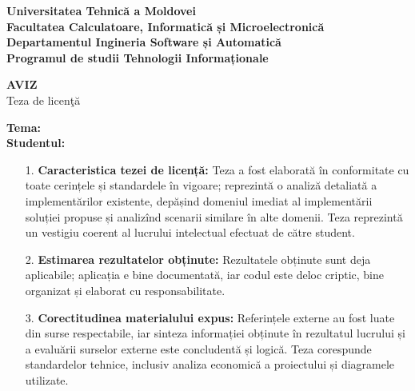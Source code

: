 \begin{titlepage}

    \newcommand{\HRule}{\rule{\linewidth}{0.5mm}}
    
    \begin{center}
        \textbf{
            Universitatea Tehnică a Moldovei\\
            Facultatea Calculatoare, Informatică și Microelectronică\\
            Departamentul Ingineria Software și Automatică\\
            Programul de studii Tehnologii Informaționale\\
        }
    \end{center}
    \center
    
    \vspace{0.3cm}
    \begin{center}
        \large \textbf{AVIZ} \\
        Teza de licenţă \\
    \vspace{0.2cm}
    
    \end{center}
    
    \begin{flushleft}
        \textbf{Tema:} \ThesisTitle \\
        \textbf{Studentul:} \MyNameFull
        
        \begin{enumerate}[leftmargin=1.4em, itemsep=1pt, parsep=0pt]
        \item [1.] \textbf{Caracteristica tezei de licență:}  Teza a fost elaborată în conformitate cu toate cerințele și standardele în vigoare; reprezintă o analiză detaliată a implementărilor existente, depășind domeniul imediat al implementării soluției propuse și analizînd scenarii similare în alte domenii. Teza reprezintă un vestigiu coerent al lucrului intelectual efectuat de către student.
        
        \item [2.] \textbf{Estimarea rezultatelor obținute:} Rezultatele obținute sunt deja aplicabile; aplicația e bine documentată, iar codul este deloc criptic, bine organizat și elaborat cu responsabilitate.
        
        \item [3.] \textbf{Corectitudinea materialului expus:} Referințele externe au fost luate din surse respectabile, iar sinteza informației obținute în rezultatul lucrului și a evaluării surselor externe este concludentă și logică. Teza corespunde standardelor tehnice, inclusiv analiza economică a proiectului și diagramele utilizate. 
        

\end{enumerate}
\end{flushleft}
\end{titlepage}
